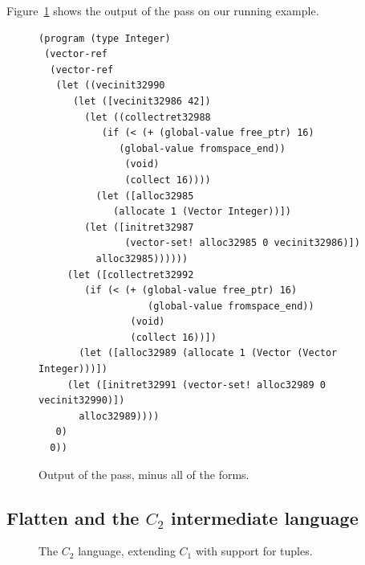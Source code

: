 \documentclass[11pt]{book}
\newcommand{\gray}[1]{{\color{lightgray} #1}}
\begin{document}
Figure~\ref{fig:expose-alloc-output} shows the output of the
 pass on our running example.

\begin{figure}[tbp]
\begin{lstlisting}
(program (type Integer)
 (vector-ref
  (vector-ref
   (let ((vecinit32990
	  (let ([vecinit32986 42])
	    (let ((collectret32988
		   (if (< (+ (global-value free_ptr) 16)
			  (global-value fromspace_end))
		       (void)
		       (collect 16))))
	      (let ([alloc32985
		     (allocate 1 (Vector Integer))])
		(let ([initret32987
		       (vector-set! alloc32985 0 vecinit32986)])
		  alloc32985))))))
     (let ([collectret32992
	    (if (< (+ (global-value free_ptr) 16)
                   (global-value fromspace_end))
                (void)
                (collect 16))])
       (let ([alloc32989 (allocate 1 (Vector (Vector Integer)))])
	 (let ([initret32991 (vector-set! alloc32989 0 vecinit32990)])
	   alloc32989))))
   0)
  0))
\end{lstlisting}
\caption{Output of the  pass, minus
  all of the  forms.}
\label{fig:expose-alloc-output}
\end{figure}


\clearpage

\subsection{Flatten and the $C_2$ intermediate language}
\label{sec:flatten-gc}

\begin{figure}[tp]
\fbox{
\begin{minipage}{0.96\textwidth}
\[
\begin{array}{lcl}
\Arg &::=& \gray{ \Int \mid \Var \mid \key{\#t} \mid \key{\#f} }\\
\itm{cmp} &::= & \gray{  \key{eq?} \mid \key{<} \mid \key{<=} \mid \key{>} \mid \key{>=}  } \\
\Exp &::= & \gray{ \Arg \mid (\key{read}) \mid (\key{-}\;\Arg) \mid (\key{+} \; \Arg\;\Arg)
      \mid (\key{not}\;\Arg) \mid (\itm{cmp}\;\Arg\;\Arg)  } \\
   &\mid& (\key{allocate} \,\itm{int}\,\itm{type})
   \mid (\key{vector-ref}\, \Arg\, \Int)  \\
   &\mid& (\key{vector-set!}\,\Arg\,\Int\,\Arg)
    \mid (\key{global-value} \,\itm{name}) \mid (\key{void}) \\
\Stmt &::=& \gray{ \ASSIGN{\Var}{\Exp} \mid \RETURN{\Arg} } \\
      &\mid& \gray{ \IF{(\itm{cmp}\, \Arg\,\Arg)}{\Stmt^{*}}{\Stmt^{*}} } \\
      &\mid& (\key{collect} \,\itm{int}) \\
C_2 & ::= & (\key{program}\;((\Var \key{.} \itm{type})^{*})\;(\key{type}\;\textit{type})\;\Stmt^{+})
\end{array}
\]
\end{minipage}
}
\caption{The $C_2$ language, extending $C_1$ with support for tuples.}
\label{fig:c2-syntax}
\end{figure}
\end{document}
